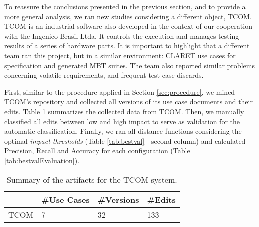 To reassure the conclusions presented in the previous section, and to provide a more general analysis, we ran new studies considering a different object, TCOM. TCOM is an industrial software also developed in the context of our cooperation with the Ingenico Brasil Ltda. It controls the execution and manages testing results of a series of hardware parts. It is important to highlight that a different team ran this project, but in a similar environment:  CLARET use cases for specification and generated MBT suites. The team also reported similar problems concerning volatile requirements, and frequent test case discards.

First, similar to the procedure applied in Section \ref{sec:procedure}, we mined TCOM's repository and collected all versions of its use case documents and their edits. Table \ref{tab:useCasesEvaluation} summarizes the collected data from TCOM. Then, we manually classified all edits between low and high impact to serve as validation for the automatic classification. Finally, we ran all distance functions considering the optimal \textit{impact thresholds} (Table \ref{tab:bestval} - second column) and calculated Precision, Recall and Accuracy for each configuration (Table \ref{tab:bestvalEvaluation}).

\begin{table}[]
\centering
\caption{Summary of the artifacts for the TCOM system.}
\label{tab:useCasesEvaluation}
\begin{tabular}{|l|l|l|l|}
\hline
     & \#Use Cases & \#Versions &\#Edits \\ \hline
TCOM &     7      &      32    &     133         \\  \hline
\end{tabular}
\end{table}



